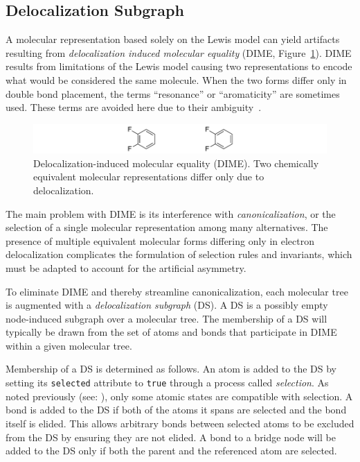 \documentclass{article}
\def\ttt{\texttt}
\begin{document}
\subsection*{Delocalization Subgraph}
\label{delocalization-subgraph}

A molecular representation based solely on the Lewis model can yield artifacts resulting from \textit{delocalization induced molecular equality} (DIME, Figure~\ref{fig:dime}). DIME results from limitations of the Lewis model causing two representations to encode what would be considered the same molecule. When the two forms differ only in double bond placement, the terms \enquote{resonance} or \enquote{aromaticity} are sometimes used. These terms are avoided here due to their ambiguity~\cite{randic:2018,kerber:2006}.

\begin{figure}
    \centering
    \includegraphics[width=\columnwidth]{dime.pdf}
    \caption{Delocalization-induced molecular equality (DIME). Two chemically equivalent molecular representations differ only due to delocalization.}
    \label{fig:dime}
\end{figure}

The main problem with DIME is its interference with \textit{canonicalization}, or the selection of a single molecular representation among many alternatives. The presence of multiple equivalent molecular forms differing only in electron delocalization complicates the formulation of selection rules and invariants, which must be adapted to account for the artificial asymmetry.

To eliminate DIME and thereby streamline canonicalization, each molecular tree is augmented with a \textit{delocalization subgraph} (DS). A DS is a possibly empty node-induced subgraph over a molecular tree. The membership of a DS will typically be drawn from the set of atoms and bonds that participate in DIME within a given molecular tree.

Membership of a DS is determined as follows. An atom is added to the DS by setting its \ttt{selected} attribute to \ttt{true} through a process called \textit{selection}. As noted previously (see: ), only some atomic states are compatible with selection. A bond is added to the DS if both of the atoms it spans are selected and the bond itself is elided. This allows arbitrary bonds between selected atoms to be excluded from the DS by ensuring they are not elided. A bond to a bridge node will be added to the DS only if both the parent and the referenced atom are selected.
\end{document}
